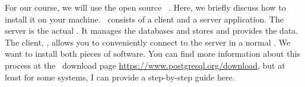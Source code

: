 %
%
%
For our course, we will use the open source  \postgresql~\cite{TA2024DDAMWPAM,FP2023LP,OH2017PUAR,B2024PELUYDW}.
Here, we briefly discuss how to install it on your machine.
\postgresql\ consists of a client and a server application.
The server is the actual .
It manages the databases and stores and provides the data.
The client, , allows you to conveniently connect to the server in a normal .
We want to install both pieces of software.
You can find more information about this process at the \postgresql\ download page \url{https://www.postgresql.org/download}, but at least for some systems, I can provide a step-by-step guide here.%
%
%
%
\endhsection%
%
